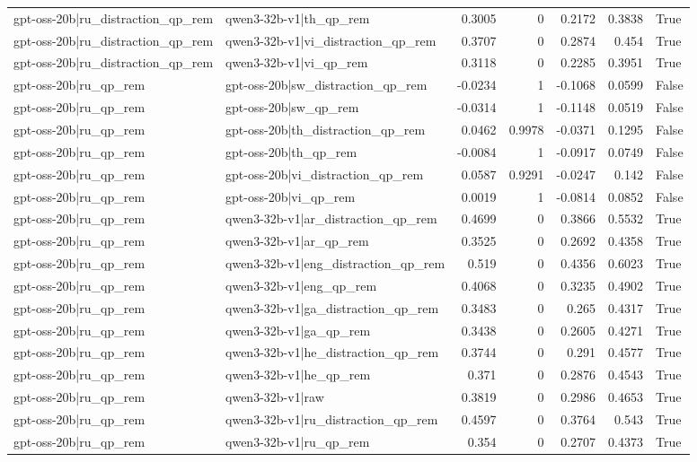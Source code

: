 \begin{table}
\begin{tabular}{l l r r r r l}
gpt-oss-20b|ru_distraction_qp_rem & qwen3-32b-v1|th_qp_rem & 0.3005 & 0 & 0.2172 & 0.3838 & True \\
gpt-oss-20b|ru_distraction_qp_rem & qwen3-32b-v1|vi_distraction_qp_rem & 0.3707 & 0 & 0.2874 & 0.454 & True \\
gpt-oss-20b|ru_distraction_qp_rem & qwen3-32b-v1|vi_qp_rem & 0.3118 & 0 & 0.2285 & 0.3951 & True \\
gpt-oss-20b|ru_qp_rem & gpt-oss-20b|sw_distraction_qp_rem & -0.0234 & 1 & -0.1068 & 0.0599 & False \\
gpt-oss-20b|ru_qp_rem & gpt-oss-20b|sw_qp_rem & -0.0314 & 1 & -0.1148 & 0.0519 & False \\
gpt-oss-20b|ru_qp_rem & gpt-oss-20b|th_distraction_qp_rem & 0.0462 & 0.9978 & -0.0371 & 0.1295 & False \\
gpt-oss-20b|ru_qp_rem & gpt-oss-20b|th_qp_rem & -0.0084 & 1 & -0.0917 & 0.0749 & False \\
gpt-oss-20b|ru_qp_rem & gpt-oss-20b|vi_distraction_qp_rem & 0.0587 & 0.9291 & -0.0247 & 0.142 & False \\
gpt-oss-20b|ru_qp_rem & gpt-oss-20b|vi_qp_rem & 0.0019 & 1 & -0.0814 & 0.0852 & False \\
gpt-oss-20b|ru_qp_rem & qwen3-32b-v1|ar_distraction_qp_rem & 0.4699 & 0 & 0.3866 & 0.5532 & True \\
gpt-oss-20b|ru_qp_rem & qwen3-32b-v1|ar_qp_rem & 0.3525 & 0 & 0.2692 & 0.4358 & True \\
gpt-oss-20b|ru_qp_rem & qwen3-32b-v1|eng_distraction_qp_rem & 0.519 & 0 & 0.4356 & 0.6023 & True \\
gpt-oss-20b|ru_qp_rem & qwen3-32b-v1|eng_qp_rem & 0.4068 & 0 & 0.3235 & 0.4902 & True \\
gpt-oss-20b|ru_qp_rem & qwen3-32b-v1|ga_distraction_qp_rem & 0.3483 & 0 & 0.265 & 0.4317 & True \\
gpt-oss-20b|ru_qp_rem & qwen3-32b-v1|ga_qp_rem & 0.3438 & 0 & 0.2605 & 0.4271 & True \\
gpt-oss-20b|ru_qp_rem & qwen3-32b-v1|he_distraction_qp_rem & 0.3744 & 0 & 0.291 & 0.4577 & True \\
gpt-oss-20b|ru_qp_rem & qwen3-32b-v1|he_qp_rem & 0.371 & 0 & 0.2876 & 0.4543 & True \\
gpt-oss-20b|ru_qp_rem & qwen3-32b-v1|raw & 0.3819 & 0 & 0.2986 & 0.4653 & True \\
gpt-oss-20b|ru_qp_rem & qwen3-32b-v1|ru_distraction_qp_rem & 0.4597 & 0 & 0.3764 & 0.543 & True \\
gpt-oss-20b|ru_qp_rem & qwen3-32b-v1|ru_qp_rem & 0.354 & 0 & 0.2707 & 0.4373 & True \\

\end{tabular}
\end{table}

